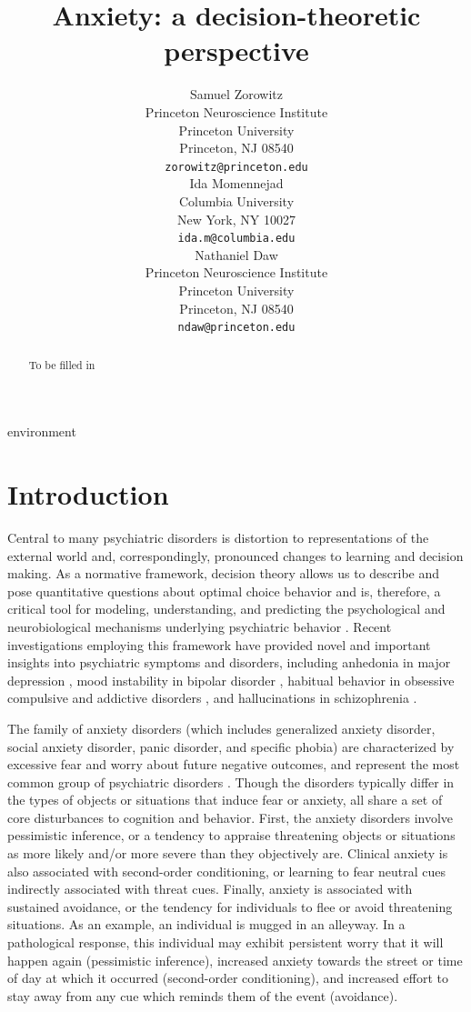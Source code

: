 environment\documentclass[11pt]{article} %
\title{Anxiety: a decision-theoretic perspective}
\author{
Samuel Zorowitz \\
Princeton Neuroscience Institute\\
Princeton University\\
Princeton, NJ 08540 \\
\texttt{zorowitz@princeton.edu} \\
\And
Ida Momennejad \\
Columbia University\\
New York, NY 10027 \\
\texttt{ida.m@columbia.edu} \\
\And
Nathaniel Daw \\
Princeton Neuroscience Institute\\
Princeton University\\
Princeton, NJ 08540 \\
\texttt{ndaw@princeton.edu} \\
}
\begin{document}
\maketitle

\begin{abstract}
To be filled in
\end{abstract}


\startmain

\section{Introduction}

Central to many psychiatric disorders is distortion to representations of the
external world and, correspondingly, pronounced changes to learning and decision
making. As a normative framework, decision theory allows us to describe and pose
quantita­tive questions about optimal choice behavior \citep{DayanDaw2008} and is,
therefore, a critical tool for modeling, understanding, and predicting the psychological
and neurobiological mechanisms underlying psychiatric behavior \citep{maia2011, HuysDawDayan2015}.
Recent investigations employing this framework have provided novel and important
insights into psychiatric symptoms and disorders, including anhedonia in major depression \citep{Rutledge2017},
mood instability in bipolar disorder \citep{EldarNiv2015, EldarDolanNiv2016},
habitual behavior in obsessive compulsive and addictive disorders \citep{gillan2016}, and
hallucinations in schizophrenia \citep{powers2017, corlett2018}.

The family of anxiety disorders (which includes generalized anxiety disorder, social
anxiety disorder, panic disorder, and specific phobia) are characterized by excessive
fear and worry about future negative outcomes, and represent the most common
group of psychiatric disorders \citep{kessler2009}. Though the disorders typically
differ in the types of objects or situations that induce fear or anxiety, all share
a set of core disturbances to cognition and behavior. First, the anxiety disorders
involve pessimistic inference, or a tendency to appraise threatening objects or
situations as more likely and/or more severe than they objectively are. Clinical
anxiety is also associated with second-order conditioning, or learning to fear
neutral cues indirectly associated with threat cues. Finally, anxiety is associated
with sustained avoidance, or the tendency for individuals to flee or avoid threatening
situations. As an example, an individual is mugged in an alleyway. In a pathological
response, this individual may exhibit persistent worry that it will happen again
(pessimistic inference), increased anxiety towards the street or time of day
at which it occurred (second-order conditioning), and increased effort to stay
away from any cue which reminds them of the event (avoidance).
\end{document}
